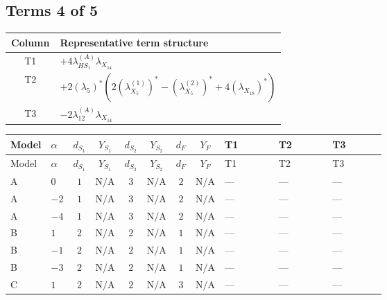 \documentclass[8pt]{article}
\begin{document}
\begin{landscape}
\subsection*{Terms 4 of 5}
\begin{center}
\begin{tabular}{@{}c >{\raggedright\arraybackslash}p{0.82\linewidth}@{}}
\toprule
Column & Representative term structure \\
\midrule
T1 & \(\displaystyle +4 {\lambda_{HS_1}^{(A)}} {\lambda_{X_{14}}}\) \\
\midrule
T2 & \(\displaystyle +2 \left({\lambda_5}\right)^{*} (2 \left({\lambda_{X_{5}}^{(1)}}\right)^{*}-\left({\lambda_{X_{5}}^{(2)}}\right)^{*}+4 \left({\lambda_{X_{18}}}\right)^{*})\) \\
\midrule
T3 & \(\displaystyle -2 {\lambda_{12}^{(A)}} {\lambda_{X_{14}}}\) \\
\midrule
\bottomrule
\end{tabular}
\end{center}
\smallskip
\tiny
\begin{longtable}{@{}llcccccc >{\raggedright\arraybackslash}p{0.21\linewidth} >{\raggedright\arraybackslash}p{0.21\linewidth} >{\raggedright\arraybackslash}p{0.21\linewidth}@{}}
\toprule
Model & $\alpha$ & $d_{S_1}$ & $Y_{S_1}$ & $d_{S_2}$ & $Y_{S_2}$ & $d_F$ & $Y_F$ & T1 & T2 & T3 \\
\midrule
\endfirsthead
\toprule
Model & $\alpha$ & $d_{S_1}$ & $Y_{S_1}$ & $d_{S_2}$ & $Y_{S_2}$ & $d_F$ & $Y_F$ & T1 & T2 & T3 \\
\midrule
\endhead
A & $0$ & $1$ & $\text{N/A}$ & $3$ & $\text{N/A}$ & $2$ & $\text{N/A}$ & --- & --- & --- \\
\midrule
A & $-2$ & $1$ & $\text{N/A}$ & $3$ & $\text{N/A}$ & $2$ & $\text{N/A}$ & --- & --- & --- \\
\midrule
A & $-4$ & $1$ & $\text{N/A}$ & $3$ & $\text{N/A}$ & $2$ & $\text{N/A}$ & --- & --- & --- \\
\midrule
B & $1$ & $2$ & $\text{N/A}$ & $2$ & $\text{N/A}$ & $1$ & $\text{N/A}$ & --- & --- & --- \\
\midrule
B & $-1$ & $2$ & $\text{N/A}$ & $2$ & $\text{N/A}$ & $1$ & $\text{N/A}$ & --- & --- & --- \\
\midrule
B & $-3$ & $2$ & $\text{N/A}$ & $2$ & $\text{N/A}$ & $1$ & $\text{N/A}$ & --- & --- & --- \\
\midrule
C & $1$ & $2$ & $\text{N/A}$ & $2$ & $\text{N/A}$ & $3$ & $\text{N/A}$ & --- & --- & --- \\
\midrule

\end{longtable}
\end{landscape}
\end{document}
